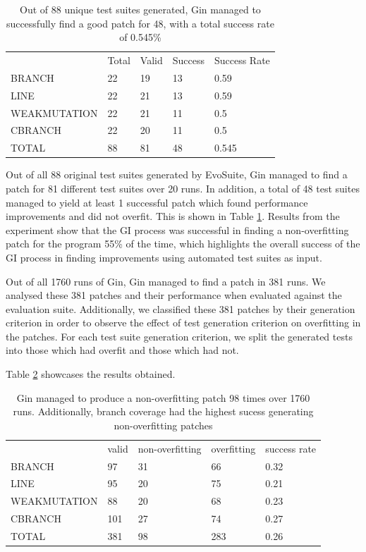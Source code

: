 \documentclass[titlepage]{article}
\begin{document}
\begin{table}[]
\centering
\begin{tabular}{lllll}
             & Total & Valid & Success & Success Rate \\
BRANCH       & 22    & 19    & 13      & 0.59         \\
LINE         & 22    & 21    & 13      & 0.59         \\
WEAKMUTATION & 22    & 21    & 11      & 0.5          \\
CBRANCH      & 22    & 20    & 11      & 0.5          \\
TOTAL        & 88    & 81    & 48      & 0.545       
\end{tabular}
\caption{Out of 88 unique test suites generated, Gin managed to successfully find a good patch for 48, with a total success rate of 0.545\%}
\label{tab:table1}
\end{table}

Out of all 88 original test suites generated by EvoSuite, Gin managed to find a patch for 81 different test suites over 20 runs. In addition, a total of 48 test suites managed to yield at least 1 successful patch which found performance improvements and did not overfit. This is shown in Table \ref{tab:table1}. Results from the experiment show that the GI process was successful in finding a non-overfitting patch for the program 55\% of the time, which highlights the overall success of the GI process in finding improvements using automated test suites as input.

Out of all 1760 runs of Gin, Gin managed to find a patch in 381  runs. We analysed these 381 patches and their performance when evaluated against the evaluation suite. Additionally, we classified these 381 patches by their generation criterion in order to observe the effect of test generation criterion on overfitting in the patches. For each test suite generation criterion, we split the generated tests into those which had overfit and those which had not. 

Table \ref{tab:table2} showcases the results obtained.

\begin{table}[h]
\centering
\begin{tabular}{lllll}
             & valid & non-overfitting & overfitting & success rate \\
BRANCH       & 97    & 31              & 66          & 0.32         \\
LINE         & 95    & 20              & 75          & 0.21         \\
WEAKMUTATION & 88    & 20              & 68          & 0.23         \\
CBRANCH      & 101   & 27              & 74          & 0.27         \\
TOTAL        & 381   & 98              & 283         & 0.26        
\end{tabular}
\caption{Gin managed to produce a non-overfitting patch 98 times over 1760 runs. Additionally, branch coverage had the highest sucess generating non-overfitting patches}
\label{tab:table2}
\end{table}
\end{document}
